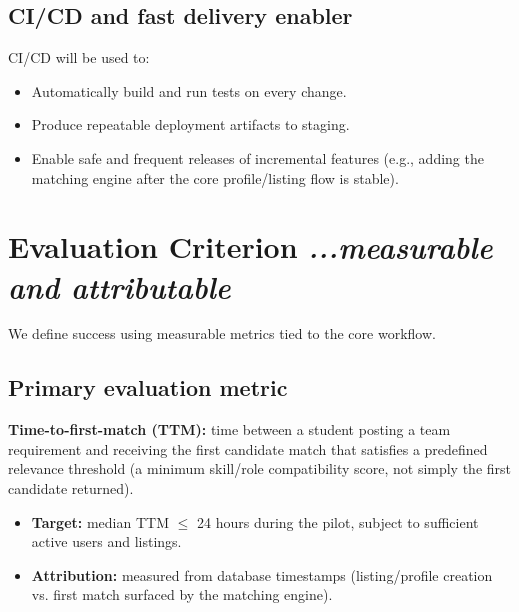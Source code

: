 \documentclass[11pt]{article}
\begin{document}
\subsection{CI/CD and fast delivery enabler}
CI/CD will be used to:
\begin{itemize}[leftmargin=*]
  \item Automatically build and run tests on every change.
  \item Produce repeatable deployment artifacts to staging.
  \item Enable safe and frequent releases of incremental features (e.g., adding the matching
  engine after the core profile/listing flow is stable).
\end{itemize}

\section{Evaluation Criterion \textit{...measurable and attributable}}
We define success using measurable metrics tied to the core workflow.

\subsection{Primary evaluation metric}
\textbf{Time-to-first-match (TTM):} time between a student posting a team requirement and
receiving the first candidate match that satisfies a predefined relevance threshold (a minimum
skill/role compatibility score, not simply the first candidate returned).
\begin{itemize}[leftmargin=*]
  \item \textbf{Target:} median TTM $\leq$ 24 hours during the pilot, subject to sufficient
  active users and listings.
  \item \textbf{Attribution:} measured from database timestamps (listing/profile creation vs.
  first match surfaced by the matching engine).
\end{itemize}
\end{document}
